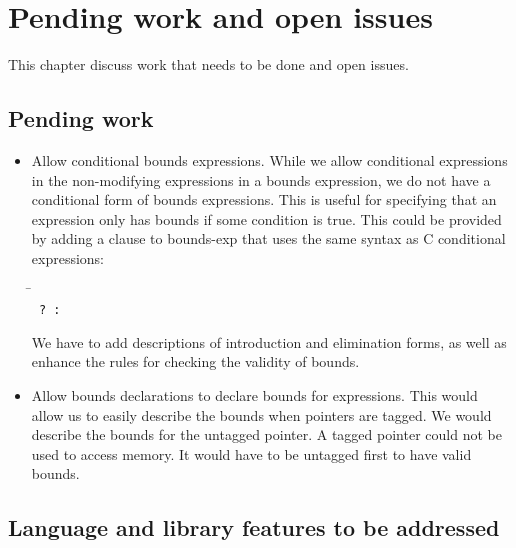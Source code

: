 
\chapter{Pending work and open issues}
\label{chapter:open-issues}

This chapter discuss work that needs to be done and open issues.

\section{Pending work}

\begin{itemize}
\item Allow conditional bounds expressions.   While we allow conditional
expressions in the non-modifying expressions in a bounds expression, we
do not have a conditional form of bounds expressions.  This is useful for
specifying that an expression only has bounds if some condition is true.
This could be provided by adding a clause to bounds-exp that uses the
same syntax as C conditional expressions:
\begin{tabbing}
\= \\
\>\texttt{ ?  : }
\end{tabbing}

We have to add descriptions of introduction and elimination
forms, as well as enhance the rules for checking the validity of bounds.
\item Allow bounds declarations to declare bounds for expressions.
This would allow us to easily describe the bounds when pointers are tagged.
We would describe the bounds for the untagged pointer.  A tagged pointer
could not be used to access memory.  It would have to be untagged first 
to have valid bounds.
\end{itemize}

\section{Language and library features to be addressed}

